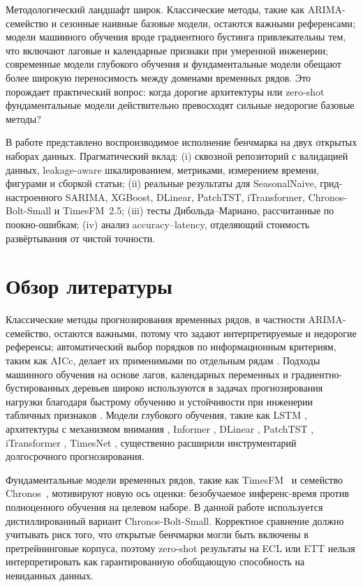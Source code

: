 \documentclass[conference]{IEEEtran}
\begin{document}
Методологический ландшафт широк. Классические методы, такие как ARIMA-семейство и сезонные наивные базовые модели, остаются важными референсами; модели машинного обучения вроде градиентного бустинга привлекательны тем, что включают лаговые и календарные признаки при умеренной инженерии; современные модели глубокого обучения и фундаментальные модели обещают более широкую переносимость между доменами временных рядов. Это порождает практический вопрос: когда дорогие архитектуры или zero-shot фундаментальные модели действительно превосходят сильные недорогие базовые методы?

В работе представлено воспроизводимое исполнение бенчмарка на двух открытых наборах данных. Прагматический вклад: (i) сквозной репозиторий с валидацией данных, leakage-aware шкалированием, метриками, измерением времени, фигурами и сборкой статьи; (ii) реальные результаты для SeasonalNaive, грид-настроенного SARIMA, XGBoost, DLinear, PatchTST, iTransformer, Chronos-Bolt-Small и TimesFM~2.5; (iii) тесты Дибольда--Мариано, рассчитанные по поокно-ошибкам; (iv) анализ accuracy--latency, отделяющий стоимость развёртывания от чистой точности.

\section{Обзор литературы}
Классические методы прогнозирования временных рядов, в частности ARIMA-семейство, остаются важными, потому что задают интерпретируемые и недорогие референсы; автоматический выбор порядков по информационным критериям, таким как AICc, делает их применимыми по отдельным рядам \cite{hyndman2008automatic}. Подходы машинного обучения на основе лагов, календарных переменных и градиентно-бустированных деревьев широко используются в задачах прогнозирования нагрузки благодаря быстрому обучению и устойчивости при инженерии табличных признаков \cite{chen2016xgboost}. Модели глубокого обучения, такие как LSTM \cite{hochreiter1997lstm}, архитектуры с механизмом внимания \cite{vaswani2017attention}, Informer \cite{zhou2021informer}, DLinear \cite{zeng2023dlinear}, PatchTST \cite{nie2023patchtst}, iTransformer \cite{liu2024itransformer}, TimesNet \cite{wu2023timesnet}, существенно расширили инструментарий долгосрочного прогнозирования.

Фундаментальные модели временных рядов, такие как TimesFM~\cite{das2024timesfm} и семейство Chronos~\cite{ansari2024chronos}, мотивируют новую ось оценки: безобучаемое инференс-время против полноценного обучения на целевом наборе. В данной работе используется дистиллированный вариант Chronos-Bolt-Small. Корректное сравнение должно учитывать риск того, что открытые бенчмарки могли быть включены в претрейнинговые корпуса, поэтому zero-shot результаты на ECL или ETT нельзя интерпретировать как гарантированную обобщающую способность на невиданных данных.
\end{document}
